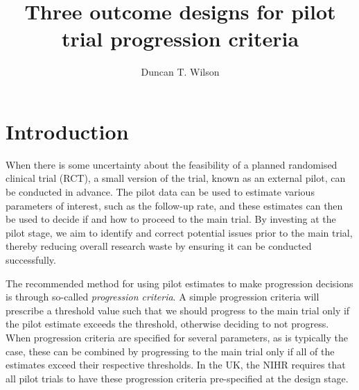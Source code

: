 \documentclass[sagev, Crown]{sagej} %
\begin{document}

\title{Three outcome designs for pilot trial progression criteria}

\author{Duncan T. Wilson}%



\begin{abstract}
\end{abstract}


\maketitle

\section{Introduction}\label{sec:introduction}

When there is some uncertainty about the feasibility of a planned randomised clinical trial (RCT), a small version of the trial, known as an external pilot, can be conducted in advance. The pilot data can be used to estimate various parameters of interest, such as the follow-up rate, and these estimates can then be used to decide if and how to proceed to the main trial. By investing at the pilot stage, we aim to identify and correct potential issues prior to the main trial, thereby reducing overall research waste by ensuring it can be conducted successfully.

The recommended method for using pilot estimates to make progression decisions is through so-called \emph{progression criteria}. A simple progression criteria will prescribe a threshold value such that we should progress to the main trial only if the pilot estimate exceeds the threshold, otherwise deciding to not progress. When progression criteria are specified for several parameters, as is typically the case, these can be combined by progressing to the main trial only if all of the estimates exceed their respective thresholds. In the UK, the NIHR requires that all pilot trials to have these progression criteria pre-specified at the design stage.
\end{document}
